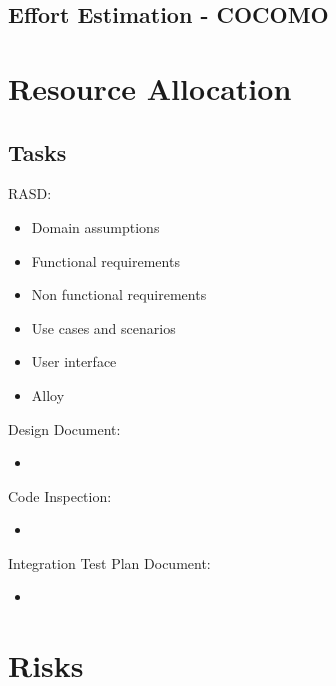 \documentclass{article}
\begin{document}
\subsection{Effort Estimation - COCOMO}
\section{Resource Allocation}
\subsection{Tasks}
RASD:
\begin{itemize}
\item Domain assumptions
\item Functional requirements
\item Non functional requirements
\item Use cases and scenarios
\item User interface
\item Alloy
\end{itemize}
Design Document:
\begin{itemize}
\item
\end{itemize}
Code Inspection:
\begin{itemize}
\item
\end{itemize}
Integration Test Plan Document:
\begin{itemize}
\item 
\end{itemize}
\section{Risks}
\end{document}
